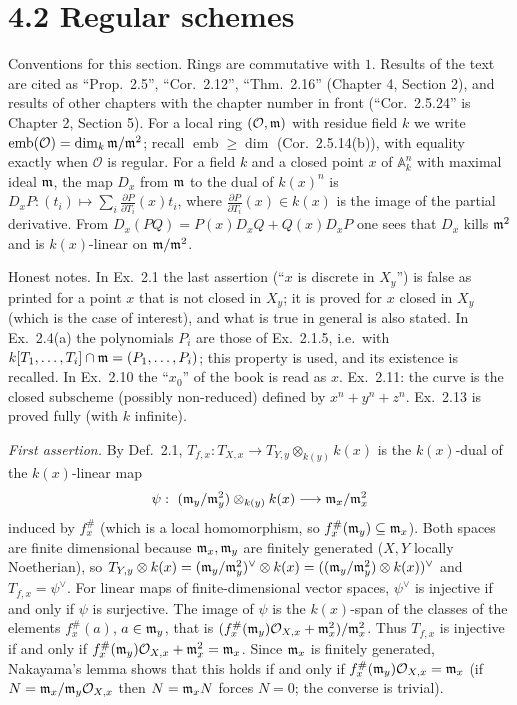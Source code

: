 \documentclass[11pt]{article}
\begin{document}
\section*{4.2 Regular schemes}

Conventions for this section. Rings are commutative with $1$. Results of the text are cited as ``Prop.~2.5'', ``Cor.~2.12'', ``Thm.~2.16'' (Chapter 4, Section 2), and results of other chapters with the chapter number in front (``Cor.~2.5.24'' is Chapter 2, Section 5). For a local ring $(\mathcal O,\mathfrak m)$ with residue field $k$ we write $\operatorname{emb}(\mathcal O)=\dim_k\mathfrak m/\mathfrak m^2$; recall $\operatorname{emb}\ge\dim$ (Cor.~2.5.14(b)), with equality exactly when $\mathcal O$ is regular. For a field $k$ and a closed point $x$ of $\mathbb A^n_k$ with maximal ideal $\mathfrak m$, the map $D_x$ from $\mathfrak m$ to the dual of $k(x)^n$ is $D_xP:(t_i)\mapsto\sum_i\frac{\partial P}{\partial T_i}(x)t_i$, where $\frac{\partial P}{\partial T_i}(x)\in k(x)$ is the image of the partial derivative. From $D_x(PQ)=P(x)D_xQ+Q(x)D_xP$ one sees that $D_x$ kills $\mathfrak m^2$ and is $k(x)$-linear on $\mathfrak m/\mathfrak m^2$.

Honest notes. In Ex.~2.1 the last assertion (``$x$ is discrete in $X_y$'') is false as printed for a point $x$ that is not closed in $X_y$; it is proved for $x$ closed in $X_y$ (which is the case of interest), and what is true in general is also stated. In Ex.~2.4(a) the polynomials $P_i$ are those of Ex.~2.1.5, i.e.\ with $k[T_1,\dots,T_i]\cap\mathfrak m=(P_1,\dots,P_i)$; this property is used, and its existence is recalled. In Ex.~2.10 the ``$x_0$'' of the book is read as $x$. Ex.~2.11: the curve is the closed subscheme (possibly non-reduced) defined by $x^n+y^n+z^n$. Ex.~2.13 is proved fully (with $k$ infinite).

\pf
\emph{First assertion.} By Def.~2.1, $T_{f,x}:T_{X,x}\to T_{Y,y}\otimes_{k(y)}k(x)$ is the $k(x)$-dual of the $k(x)$-linear map
\[ \psi:\ (\fm_y/\fm_y^2)\otimes_{k(y)}k(x)\longrightarrow \fm_x/\fm_x^2 \]
induced by $f^\#_x$ (which is a local homomorphism, so $f^\#_x(\mathfrak m_y)\subseteq\mathfrak m_x$). Both spaces are finite dimensional because $\mathfrak m_x,\mathfrak m_y$ are finitely generated ($X,Y$ locally Noetherian), so $T_{Y,y}\otimes k(x)=(\mathfrak m_y/\mathfrak m_y^2)^\vee\otimes k(x)=((\mathfrak m_y/\mathfrak m_y^2)\otimes k(x))^\vee$ and $T_{f,x}=\psi^\vee$. For linear maps of finite-dimensional vector spaces, $\psi^\vee$ is injective if and only if $\psi$ is surjective. The image of $\psi$ is the $k(x)$-span of the classes of the elements $f^\#_x(a)$, $a\in\mathfrak m_y$, that is $(f^\#_x(\mathfrak m_y)\mathcal O_{X,x}+\mathfrak m_x^2)/\mathfrak m_x^2$. Thus $T_{f,x}$ is injective if and only if $f^\#_x(\mathfrak m_y)\mathcal O_{X,x}+\mathfrak m_x^2=\mathfrak m_x$. Since $\mathfrak m_x$ is finitely generated, Nakayama's lemma shows that this holds if and only if $f^\#_x(\mathfrak m_y)\mathcal O_{X,x}=\mathfrak m_x$ (if $N=\mathfrak m_x/\mathfrak m_y\mathcal O_{X,x}$ then $N=\mathfrak m_xN$ forces $N=0$; the converse is trivial).
\end{document}
